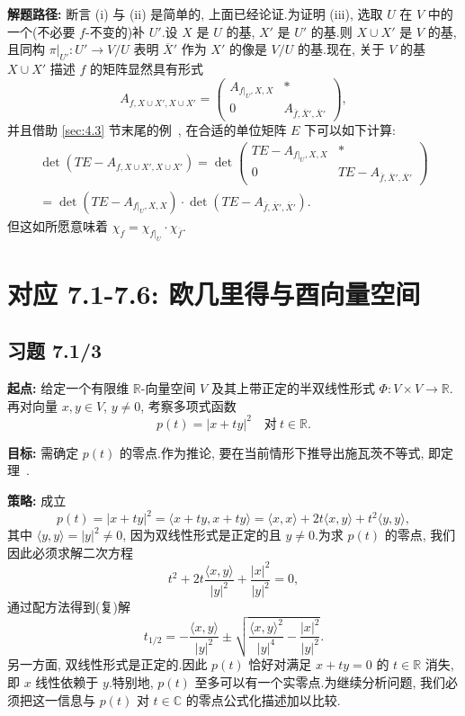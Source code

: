 \noindent\textbf{解题路径:} 断言 (i) 与 (ii) 是简单的, 上面已经论证.为证明 (iii), 选取 $U$ 在 $V$ 中的一个(不必要 $f$-不变的)补 $U'$.设 $X$ 是 $U$ 的基, $X'$ 是 $U'$ 的基.则 $X \cup X'$ 是 $V$ 的基, 且同构 $\pi|_{U'} \colon U' \longrightarrow V/U$ 表明 $\overline{X}'$ 作为 $X'$ 的像是 $V/U$ 的基.现在, 关于 $V$ 的基 $X \cup X'$ 描述 $f$ 的矩阵显然具有形式
\[
A_{f, X \cup X', X \cup X'} = \begin{pmatrix}
A_{f|_U, X, X} & * \\
0 & A_{\overline{f}, \overline{X}', \overline{X}'}
\end{pmatrix},
\]
并且借助 \ref{sec:4.3} 节末尾的例~, 在合适的单位矩阵 $E$ 下可以如下计算:
\[
\begin{array}{l}
\det(TE - A_{f, X \cup X', X \cup X'}) = \det \begin{pmatrix}
TE - A_{f|_U, X, X} & * \\
0 & TE - A_{\overline{f}, \overline{X}', \overline{X}'}
\end{pmatrix} \\
= \det(TE - A_{f|_U, X, X}) \cdot \det(TE - A_{\overline{f}, \overline{X}', \overline{X}'})\text{.}
\end{array}
\]
但这如所愿意味着 $\chi_f = \chi_{f|_U} \cdot \chi_{\overline{f}}$.


\section*{对应 7.1-7.6: 欧几里得与酉向量空间}

\subsection*{习题 7.1/3}

\noindent\textbf{起点:} 给定一个有限维 $\mathbb{R}$-向量空间 $V$ 及其上带正定的半双线性形式
$\varPhi \colon V \times V \longrightarrow \mathbb{R}$.再对向量 $x, y \in V$, $y \neq 0$,
考察多项式函数
\[
p(t) = |x + t y|^2 \quad \text{对} \ t \in \mathbb{R}\text{.}
\]

\noindent\textbf{目标:} 需确定 $p(t)$ 的零点.作为推论, 要在当前情形下推导出施瓦茨不等式,
即定理~.

\noindent\textbf{策略:} 成立
\[
p(t) = |x + t y|^2 = \langle x + t y, x + t y \rangle = \langle x, x \rangle + 2 t \langle x, y \rangle + t^2 \langle y, y \rangle,
\]
其中 $\langle y, y \rangle = |y|^2 \neq 0$, 因为双线性形式是正定的且 $y \neq 0$.为求 $p(t)$
的零点, 我们因此必须求解二次方程
\[
t^2 + 2 t \frac{\langle x, y \rangle}{|y|^2} + \frac{|x|^2}{|y|^2} = 0,
\]
通过配方法得到(复)解
\[
t_{1/2} = -\frac{\langle x, y \rangle}{|y|^2} \pm \sqrt{\frac{\langle x, y \rangle^2}{|y|^4} - \frac{|x|^2}{|y|^2}}\text{.}
\]
另一方面, 双线性形式是正定的.因此 $p(t)$ 恰好对满足 $x + t y = 0$ 的 $t \in \mathbb{R}$ 消失, 即 $x$ 线性依赖于 $y$.特别地, $p(t)$ 至多可以有一个实零点.为继续分析问题, 我们必须把这一信息与 $p(t)$ 对 $t \in \mathbb{C}$ 的零点公式化描述加以比较.

